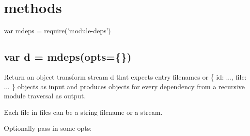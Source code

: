 \section*{methods}


\begin{DoxyCode}
var mdeps = require('module-deps')
\end{DoxyCode}


\subsection*{var d = mdeps(opts=\{\})}

Return an object transform stream {\ttfamily d} that expects entry filenames or {\ttfamily \{ id\+: ..., file\+: ... \}} objects as input and produces objects for every dependency from a recursive module traversal as output.

Each file in {\ttfamily files} can be a string filename or a stream.

Optionally pass in some {\ttfamily opts}\+:


